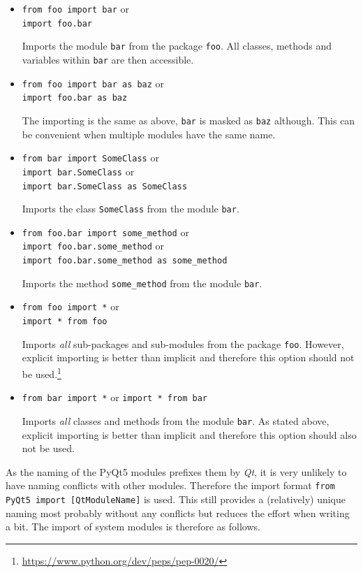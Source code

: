 \documentclass[10pt, openright, notitlepage]{scrreprt}
\begin{document}
\begin{enumerate}
\begin{itemize}
\item \texttt{from foo import bar} or\\
\texttt{import foo.bar}

Imports the module \texttt{bar} from the package \texttt{foo}. All classes, methods and
variables within \texttt{bar} are then accessible.

\item \texttt{from foo import bar as baz} or\\
\texttt{import foo.bar as baz}

The importing is the same as above, \texttt{bar} is masked as \texttt{baz} although. This
can be convenient when multiple modules have the same name.

\item \texttt{from bar import SomeClass} or\\
\texttt{import bar.SomeClass} or\\
\texttt{import bar.SomeClass as SomeClass}

Imports the class \texttt{SomeClass} from the module \texttt{bar}.

\item \texttt{from foo.bar import some\_method} or\\
\texttt{import foo.bar.some\_method} or\\
\texttt{import foo.bar.some\_method as some\_method}

Imports the method \texttt{some\_method} from the module \texttt{bar}.

\item \texttt{from foo import *} or\\
\texttt{import * from foo}

Imports \emph{all} sub-packages and sub-modules from the package \texttt{foo}. However,
explicit importing is better than implicit and therefore this option should
not be used.\footnote{\url{https://www.python.org/dev/peps/pep-0020/}}

\item \texttt{from bar import *} or
\texttt{import * from bar}

Imports \emph{all} classes and methods from the module \texttt{bar}. As stated above,
explicit importing is better than implicit and therefore this option should
also not be used.
\end{itemize}

As the naming of the PyQt5 modules prefixes them by \emph{Qt}, it is very unlikely to
have naming conflicts with other modules. Therefore the import format \texttt{from
PyQt5 import [QtModuleName]} is used. This still provides a (relatively) unique
naming most probably without any conflicts but reduces the effort when
writing a bit. The import of system modules is therefore as follows.


\end{enumerate}
\end{document}
